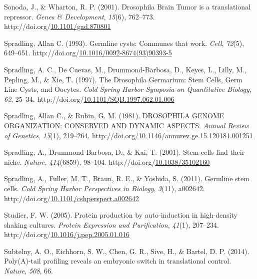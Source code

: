 \documentclass[12pt,oneside]{reedthesis}
\newlength{\cslhangindent}
\newenvironment{CSLReferences}[2] %
 {%
  \setlength{\parindent}{0pt}
  \ifodd #1 \everypar{\setlength{\hangindent}{\cslhangindent}}\ignorespaces\fi
  \ifnum #2 > 0
  \setlength{\parskip}{#2\baselineskip}
  \fi
 }%
 {}
\begin{document}
\begin{CSLReferences}{1}{0}
\leavevmode{}%
Sonoda, J., \& Wharton, R. P. (2001). Drosophila {Brain Tumor} is a translational repressor. \emph{Genes \& Development}, \emph{15}(6), 762--773. http://doi.org/\href{https://doi.org/10.1101/gad.870801}{10.1101/gad.870801}

\leavevmode{}%
Spradling, Allan C. (1993). Germline cysts: {Communes} that work. \emph{Cell}, \emph{72}(5), 649--651. http://doi.org/\href{https://doi.org/10.1016/0092-8674(93)90393-5}{10.1016/0092-8674(93)90393-5}

\leavevmode{}%
Spradling, A. C., De Cuevas, M., Drummond-Barbosa, D., Keyes, L., Lilly, M., Pepling, M., \& Xie, T. (1997). The {Drosophila Germarium}: {Stem Cells}, {Germ Line Cysts}, and {Oocytes}. \emph{Cold Spring Harbor Symposia on Quantitative Biology}, \emph{62}, 25--34. http://doi.org/\href{https://doi.org/10.1101/SQB.1997.062.01.006}{10.1101/SQB.1997.062.01.006}

\leavevmode{}%
Spradling, Allan C., \& Rubin, G. M. (1981). {DROSOPHILA GENOME ORGANIZATION}: {CONSERVED AND DYNAMIC ASPECTS}. \emph{Annual Review of Genetics}, \emph{15}(1), 219--264. http://doi.org/\href{https://doi.org/10.1146/annurev.ge.15.120181.001251}{10.1146/annurev.ge.15.120181.001251}

\leavevmode{}%
Spradling, A., Drummond-Barbosa, D., \& Kai, T. (2001). Stem cells find their niche. \emph{Nature}, \emph{414}(6859), 98--104. http://doi.org/\href{https://doi.org/10.1038/35102160}{10.1038/35102160}

\leavevmode{}%
Spradling, A., Fuller, M. T., Braun, R. E., \& Yoshida, S. (2011). Germline stem cells. \emph{Cold Spring Harbor Perspectives in Biology}, \emph{3}(11), a002642. http://doi.org/\href{https://doi.org/10.1101/cshperspect.a002642}{10.1101/cshperspect.a002642}

\leavevmode{}%
Studier, F. W. (2005). Protein production by auto-induction in high-density shaking cultures. \emph{Protein Expression and Purification}, \emph{41}(1), 207--234. http://doi.org/\href{https://doi.org/10.1016/j.pep.2005.01.016}{10.1016/j.pep.2005.01.016}

\leavevmode{}%
Subtelny, A. O., Eichhorn, S. W., Chen, G. R., Sive, H., \& Bartel, D. P. (2014). Poly({A})-tail profiling reveals an embryonic switch in translational control. \emph{Nature}, \emph{508}, 66.


\end{CSLReferences}
\end{document}
